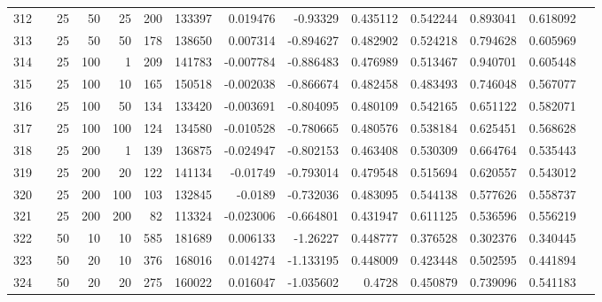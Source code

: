 \begin{longtable}{llrrrrrrrrrrrr}
		312 & &           25 &                50 &           25 &         200 &     133397 &  0.019476 &  -0.93329 &  0.435112 &    0.542244 &       0.893041 &  0.618092 \\
		313 & &           25 &                50 &           50 &         178 &     138650 &  0.007314 & -0.894627 &  0.482902 &    0.524218 &       0.794628 &  0.605969 \\
		314 & &           25 &               100 &            1 &         209 &     141783 & -0.007784 & -0.886483 &  0.476989 &    0.513467 &       0.940701 &  0.605448 \\
		315 & &           25 &               100 &           10 &         165 &     150518 & -0.002038 & -0.866674 &  0.482458 &    0.483493 &       0.746048 &  0.567077 \\
		316 & &           25 &               100 &           50 &         134 &     133420 & -0.003691 & -0.804095 &  0.480109 &    0.542165 &       0.651122 &  0.582071 \\
		317 & &           25 &               100 &          100 &         124 &     134580 & -0.010528 & -0.780665 &  0.480576 &    0.538184 &       0.625451 &  0.568628 \\
		318 & &           25 &               200 &            1 &         139 &     136875 & -0.024947 & -0.802153 &  0.463408 &    0.530309 &       0.664764 &  0.535443 \\
		319 & &           25 &               200 &           20 &         122 &     141134 &  -0.01749 & -0.793014 &  0.479548 &    0.515694 &       0.620557 &  0.543012 \\
		320 & &           25 &               200 &          100 &         103 &     132845 &   -0.0189 & -0.732036 &  0.483095 &    0.544138 &       0.577626 &  0.558737 \\
		321 & &           25 &               200 &          200 &          82 &     113324 & -0.023006 & -0.664801 &  0.431947 &    0.611125 &       0.536596 &  0.556219 \\
		322 & &           50 &                10 &           10 &         585 &     181689 &  0.006133 &  -1.26227 &  0.448777 &    0.376528 &       0.302376 &  0.340445 \\
		323 & &           50 &                20 &           10 &         376 &     168016 &  0.014274 & -1.133195 &  0.448009 &    0.423448 &       0.502595 &  0.441894 \\
		324 & &           50 &                20 &           20 &         275 &     160022 &  0.016047 & -1.035602 &    0.4728 &    0.450879 &       0.739096 &  0.541183 \\

\end{longtable}
